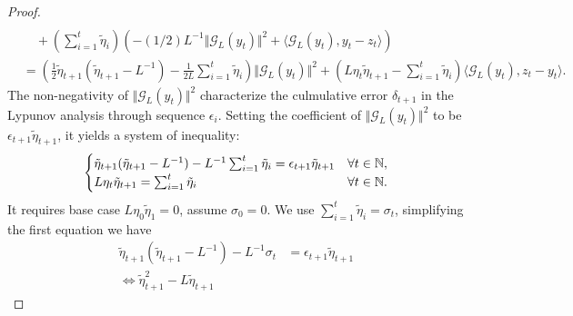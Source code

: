 \documentclass[12pt]{article}
\begin{document}
\begin{proof}
{\begin{align*}
                \\ 
                &\quad 
                + 
                \left(
                    \sum_{i = 1}^{t}\tilde\eta_i 
                \right)\left(
                    -(1/2)L^{-1}\Vert \mathcal G_L(y_t)\Vert^2
                    + 
                    \langle \mathcal G_L(y_t), y_t - z_t\rangle
                \right)
                \\
                &= 
                \left(
                    \frac{1}{2}\tilde\eta_{t + 1}\left(
                        \tilde \eta_{t +1} - L^{-1}
                    \right)
                    - 
                    \frac{1}{2L}\sum_{i = 1}^{t}\tilde \eta_i
                \right)\Vert \mathcal G_L(y_t)\Vert^2 + 
                \left(
                    L\eta_t \tilde \eta_{t + 1} - \sum_{i = 1}^{t}\tilde \eta_i
                \right)\langle \mathcal G_L(y_t), z_t - y_t\rangle. 
            \end{align*}
            }
            The non-negativity of $\Vert \mathcal G_L(y_t) \Vert^2$ characterize the culmulative error $\delta_{t + 1}$ in the Lypunov analysis through sequence $\epsilon_i$. 
            Setting the coefficient of $\Vert \mathcal G_L(y_t) \Vert^2$ to be $\epsilon_{t + 1}\tilde \eta_{t + 1}$, it yields a system of inequality: 
            \begin{align*}
                \begin{cases}
                    \tilde \eta_{t + 1} (\tilde \eta_{t + 1} - L^{-1})
                    - L^{-1} \sum_{i= 1}^{t}\tilde \eta_i 
                    = 
                    \epsilon_{t + 1} \tilde \eta_{t + 1}
                    & \forall t \in \mathbb N, 
                    \\
                    L \eta_t \tilde \eta_{t + 1} = \sum_{i=1}^{t}\tilde \eta_i 
                    & \forall t \in \mathbb N. 
                \end{cases}
            \end{align*}
            It requires base case $L\eta_0\tilde\eta_{1} = 0$, assume $\sigma_0 = 0$. 
            We use $\sum_{i = 1}^t \tilde \eta_i = \sigma_t$, simplifying the first equation we have 
            \begin{align*}
                \tilde \eta_{t + 1} (\tilde \eta_{t + 1} - L^{-1})
                - L^{-1} \sigma_t
                &= 
                \epsilon_{t + 1} \tilde \eta_{t + 1}
                \\
                \iff 
                \tilde \eta_{t + 1} ^2 - L \tilde \eta_{t + 1} 

\end{align*}
\end{proof}
\end{document}
